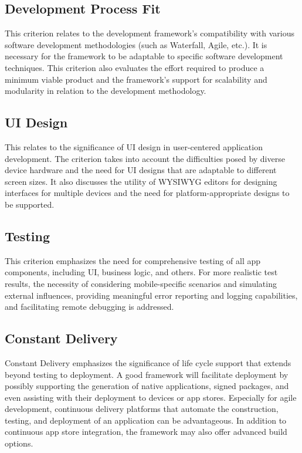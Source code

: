 \subsection{Development Process Fit}
This criterion relates to the development framework's compatibility with various software development methodologies (such as Waterfall, Agile, etc.). It is necessary for the framework to be adaptable to specific software development techniques. This criterion also evaluates the effort required to produce a minimum viable product and the framework's support for scalability and modularity in relation to the development methodology.

\subsection{UI Design}
This relates to the significance of UI design in user-centered application development. The criterion takes into account the difficulties posed by diverse device hardware and the need for UI designs that are adaptable to different screen sizes. It also discusses the utility of WYSIWYG editors for designing interfaces for multiple devices and the need for platform-appropriate designs to be supported.

\subsection{Testing}
This criterion emphasizes the need for comprehensive testing of all app components, including UI, business logic, and others. For more realistic test results, the necessity of considering mobile-specific scenarios and simulating external influences, providing meaningful error reporting and logging capabilities, and facilitating remote debugging is addressed.

\subsection{Constant Delivery}
Constant Delivery emphasizes the significance of life cycle support that extends beyond testing to deployment. A good framework will facilitate deployment by possibly supporting the generation of native applications, signed packages, and even assisting with their deployment to devices or app stores. Especially for agile development, continuous delivery platforms that automate the construction, testing, and deployment of an application can be advantageous. In addition to continuous app store integration, the framework may also offer advanced build options.

